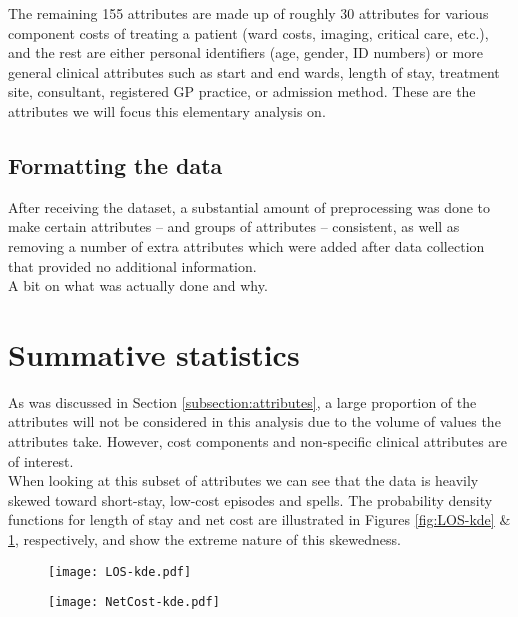 \documentclass{article}
\begin{document}
The remaining 155 attributes are made up of roughly 30 attributes for various
component costs of treating a patient (ward costs, imaging, critical care,
etc.), and the rest are either personal identifiers (age, gender, ID numbers) or
more general clinical attributes such as start and end wards, length of stay,
treatment site, consultant, registered GP practice, or admission method. These
are the attributes we will focus this elementary analysis on.


\subsection{Formatting the data}\label{subsection:formatting}

After receiving the dataset, a substantial amount of preprocessing was done to
make certain attributes -- and groups of attributes -- consistent, as well as
removing a number of extra attributes which were added after data collection
that provided no additional information. \\

A bit on what was actually done and why.


\section{Summative statistics}\label{section:summative}

As was discussed in Section \ref{subsection:attributes}, a large proportion of 
the attributes will not be considered in this analysis due to the volume of
values the attributes take. However, cost components and non-specific clinical
attributes are of interest. \\

When looking at this subset of attributes we can see that the data is heavily 
skewed toward short-stay, low-cost episodes and spells. The probability
density functions for length of stay and net cost are illustrated in Figures 
\ref{fig:LOS-kde} \& \ref{fig:NetCost-kde}, respectively, and show the extreme
nature of this skewedness.

\begin{figure}[h]
	\centering
	\begin{minipage}{.5\textwidth}
		\centering
		\texttt{[image: LOS-kde.pdf]}
		\label{fig:LOS-kde}
	\end{minipage}%
	\begin{minipage}{.5\textwidth}
		\centering
		\texttt{[image: NetCost-kde.pdf]}
		\label{fig:NetCost-kde}
	\end{minipage}
\end{figure}
\end{document}
